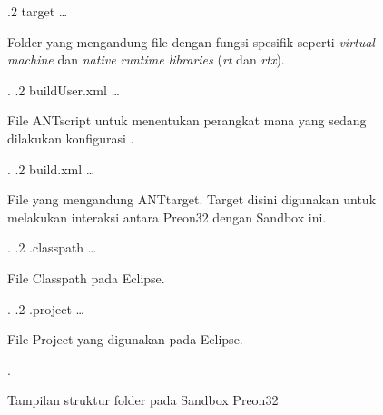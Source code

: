 \begin{figure}[htbp]
{					.2 {target} \ldots{} \begin{minipage}[t]{7cm}Folder yang mengandung file dengan fungsi spesifik seperti \textit{virtual machine} dan \textit{native runtime libraries} (\textit{rt} dan \textit{rtx}){.}\end{minipage}.
					.2 {buildUser.xml} \ldots{} \begin{minipage}[t]{7cm}File ANTscript untuk menentukan perangkat mana yang sedang dilakukan konfigurasi {.}\end{minipage}.
					.2 {build.xml} \ldots{} \begin{minipage}[t]{7cm}File yang mengandung ANTtarget{.} Target disini digunakan untuk melakukan interaksi antara Preon32 dengan Sandbox ini{.}\end{minipage}.
					.2 {.classpath} \ldots{} \begin{minipage}[t]{7cm}File Classpath pada Eclipse{.}\end{minipage}.
					.2 {.project} \ldots{} \begin{minipage}[t]{7cm}File Project yang digunakan pada Eclipse{.}\end{minipage}.	
				}
				\caption{Tampilan struktur folder pada Sandbox Preon32}
				\label{fig:Sandbox-structure}
\end{figure}

